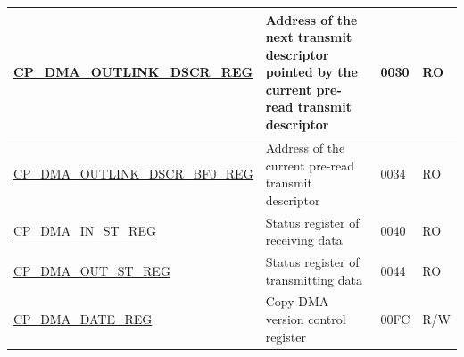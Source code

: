\begin{longtable}{ | p{6cm} | p{7.2cm} | p{1.3cm} | p{1cm} | }
\hyperref[regdesc:CPDMAOUTLINKDSCRREG]{CP\_DMA\_OUTLINK\_DSCR\_REG} & Address of the next transmit descriptor pointed by the current pre-read transmit descriptor  & \hexprefix{}0030 & RO \\ \hline
\hyperref[regdesc:CPDMAOUTLINKDSCRBF0REG]{CP\_DMA\_OUTLINK\_DSCR\_BF0\_REG} & Address of the current pre-read transmit descriptor & \hexprefix{}0034 & RO \\ \hline
\hyperref[regdesc:CPDMAINSTREG]{CP\_DMA\_IN\_ST\_REG} & Status register of receiving data & \hexprefix{}0040 & RO \\ \hline
\hyperref[regdesc:CPDMAOUTSTREG]{CP\_DMA\_OUT\_ST\_REG} & Status register of transmitting data & \hexprefix{}0044 & RO \\ \hline
\hyperref[regdesc:CPDMADATEREG]{CP\_DMA\_DATE\_REG} & Copy DMA version control register & \hexprefix{}00FC & R/W \\ \hline
\end{longtable}

